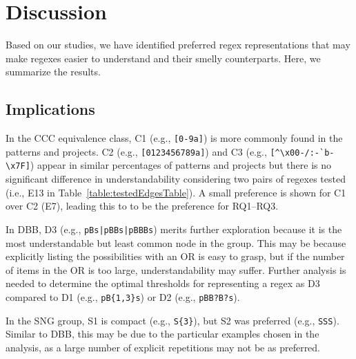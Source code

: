 \section{Discussion}
\label{sec:discussion}
Based on our studies, we have identified preferred regex representations that may make regexes easier to understand and their smelly counterparts. Here, we summarize the results.


\subsection{Implications}
In the CCC equivalence class, C1 (e.g., \verb![0-9a]!) is more commonly found in the patterns and projects.  C2 (e.g., \verb![0123456789a]!) and C3 (e.g., \verb![^\x00-/:-`b-\x7F]!) appear in similar percentages of patterns and projects but there is no significant difference in understandability considering two pairs of regexes tested (i.e., E13 in Table~\ref{table:testedEdgesTable}). 
A small preference is shown for C1 over C2 (E7), leading this to to be the preference for RQ1--RQ3.


In DBB, D3 (e.g., \verb!pBs|pBBs|pBBBs!) merits further exploration because it is the most understandable but least common node in the group.  This may be because explicitly listing the possibilities with an OR is easy to grasp, but if the number of items in the OR is too large, understandability may suffer. Further analysis is needed to determine the optimal thresholds for representing a regex as D3 compared to D1 (e.g., \verb!pB{1,3}s!) or D2 (e.g., \verb!pBB?B?s!).

In the SNG group, S1 is compact (e.g., \verb!S{3}!), but S2 was preferred (e.g., \verb!SSS!). Similar to DBB, this may be due to the particular examples chosen in the analysis, as a large number of explicit repetitions may not be as preferred.

